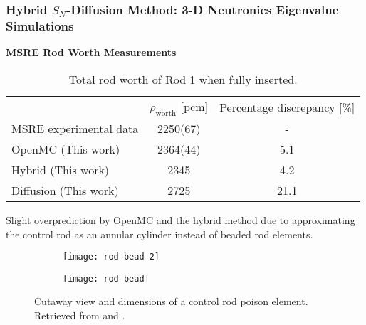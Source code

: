 \begin{frame}
  \frametitle{Hybrid $S_N$-Diffusion Method: 3-D Neutronics Eigenvalue Simulations}
  \textbf{MSRE Rod Worth Measurements}
  \begin{table}[t]
    \centering
    \caption{Total rod worth of Rod 1 when fully inserted.}
    \begin{tabular}{l S[table-format=4(2)] S}
      \toprule
       & {$\rho_\text{worth}$ [pcm]} & {Percentage discrepancy [\%]}\\
       \cmidrule(rl){2-2} \cmidrule(l){3-3}
      \gls{MSRE} experimental data & 2250(67) & {-}\\
      OpenMC (This work) & 2364(44) & 5.1 \\
      Hybrid (This work) & 2345 & 4.2 \\
      Diffusion (This work) & 2725 & 21.1 \\
      \bottomrule
    \end{tabular}
    \label{table:rod-worth}
  \end{table}
  \vspace{.2cm}

  Slight overprediction by OpenMC and the hybrid method due to approximating the control rod
  as an annular cylinder instead of beaded rod elements.
  \begin{figure}[t]
    \begin{subfigure}[b]{0.22\columnwidth}
      \centering
      \texttt{[image: rod-bead-2]}
    \end{subfigure}
    \begin{subfigure}[b]{0.44\columnwidth}
      \centering
      \texttt{[image: rod-bead]}
    \end{subfigure}
    \caption{Cutaway view and dimensions of a control rod poison element. Retrieved from
    \cite{tolson_msre_1967} and \cite{robertson_msre_1965}.}
    \label{fig:rod-bead}
  \end{figure}
\end{frame}

